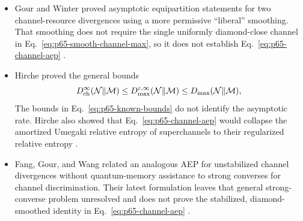 \begin{itemize}
  \item Gour and Winter proved asymptotic equipartition statements for two
  channel-resource divergences using a more permissive ``liberal'' smoothing.
  That smoothing does not require the single uniformly diamond-close channel
  in Eq.~\eqref{eq:p65-smooth-channel-max}, so it does not establish
  Eq.~\eqref{eq:p65-channel-aep}
  .

  \item Hirche proved the general bounds
  \begin{equation}
    D_{\rm ch}^{\infty}(\mathcal N\|\mathcal M)
    \leq D_{\max}^{\varepsilon,\infty}(\mathcal N\|\mathcal M)
    \leq D_{\max}(\mathcal N\|\mathcal M),
    \label{eq:p65-known-bounds}
  \end{equation}
  The bounds in Eq.~\eqref{eq:p65-known-bounds} do not identify the
  asymptotic rate.  Hirche also showed that Eq.~\eqref{eq:p65-channel-aep}
  would collapse the amortized
  Umegaki relative entropy of superchannels to their regularized relative
  entropy .

  \item Fang, Gour, and Wang related an analogous AEP for unstabilized channel
  divergences without quantum-memory assistance to strong converses for
  channel discrimination.  Their latest formulation leaves that general
  strong-converse problem unresolved and does not prove the stabilized,
  diamond-smoothed identity in Eq.~\eqref{eq:p65-channel-aep}
  .


\end{itemize}

